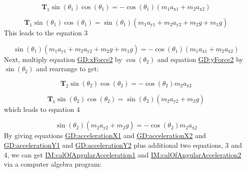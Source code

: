 \documentclass[12pt]{article}
\begin{document}
\begin{displaymath}
{\symbf{T}_{1}} \sin\left({θ_{1}}\right) \cos\left({θ_{1}}\right)=-\cos\left({θ_{1}}\right) \left({m_{1}} {a_{\text{x}1}}+{m_{2}} {a_{\text{x}2}}\right)
\end{displaymath}

\begin{displaymath}
{\symbf{T}_{1}} \sin\left({θ_{1}}\right) \cos\left({θ_{1}}\right)=\sin\left({θ_{1}}\right) \left({m_{1}} {a_{\text{y}1}}+{m_{2}} {a_{\text{y}2}}+{m_{2}} g+{m_{1}} g\right)
\end{displaymath}
This leads to the equation 3

\begin{displaymath}
\sin\left({θ_{1}}\right) \left({m_{1}} {a_{\text{y}1}}+{m_{2}} {a_{\text{y}2}}+{m_{2}} g+{m_{1}} g\right)=-\cos\left({θ_{1}}\right) \left({m_{1}} {a_{\text{x}1}}+{m_{2}} {a_{\text{x}2}}\right)
\end{displaymath}
Next, multiply equation \hyperref[GD:xForce2]{GD:xForce2} by $\cos\left({θ_{2}}\right)$ and equation \hyperref[GD:yForce2]{GD:yForce2} by $\sin\left({θ_{2}}\right)$ and rearrange to get:

\begin{displaymath}
{\symbf{T}_{2}} \sin\left({θ_{2}}\right) \cos\left({θ_{2}}\right)=-\cos\left({θ_{2}}\right) {m_{2}} {a_{\text{x}2}}
\end{displaymath}

\begin{displaymath}
{\symbf{T}_{1}} \sin\left({θ_{2}}\right) \cos\left({θ_{2}}\right)=\sin\left({θ_{2}}\right) \left({m_{2}} {a_{\text{y}2}}+{m_{2}} g\right)
\end{displaymath}
which leads to equation 4

\begin{displaymath}
\sin\left({θ_{2}}\right) \left({m_{2}} {a_{\text{y}2}}+{m_{2}} g\right)=-\cos\left({θ_{2}}\right) {m_{2}} {a_{\text{x}2}}
\end{displaymath}
By giving equations \hyperref[GD:accelerationX1]{GD:accelerationX1} and \hyperref[GD:accelerationX2]{GD:accelerationX2} and \hyperref[GD:accelerationY1]{GD:accelerationY1} and \hyperref[GD:accelerationY2]{GD:accelerationY2} plus additional two equations, 3 and 4, we can get \hyperref[IM:calOfAngularAcceleration1]{IM:calOfAngularAcceleration1} and \hyperref[IM:calOfAngularAcceleration2]{IM:calOfAngularAcceleration2} via a computer algebra program:
\end{document}
